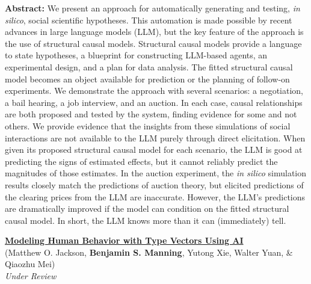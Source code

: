 \documentclass[margin,line,pifont,palatino,courier, 9pt]{res}
\begin{document}
\begin{resume}
\begin{singlespace}
\footnotesize
\textbf{Abstract:}
We present an approach for automatically generating and testing, \emph{in silico}, social scientific hypotheses.
This automation is made possible by recent advances in large language models (LLM), but the key feature of the approach is the use of structural causal models. 
Structural causal models provide a language to state hypotheses, a blueprint for constructing LLM-based agents, an experimental design, and a plan for data analysis.
The fitted structural causal model becomes an object available for prediction or the planning of follow-on experiments.
We demonstrate the approach with several scenarios: a negotiation, a bail hearing, a job interview, and an auction.
In each case, causal relationships are both proposed and tested by the system, finding evidence for some and not others.
We provide evidence that the insights from these simulations of social interactions are not available to the LLM purely through direct elicitation.
When given its proposed structural causal model for each scenario, the LLM is good at predicting the signs of estimated effects, but it cannot reliably predict the magnitudes of those estimates.
In the auction experiment, the \emph{in silico} simulation results closely match the predictions of auction theory, but elicited predictions of the clearing prices from the LLM are inaccurate.
However, the LLM's predictions are dramatically improved if the model can condition on the fitted structural causal model.
In short, the LLM knows more than it can (immediately) tell. 
\end{singlespace}


\href{https://arxiv.org/abs/2608.18265}{\bf Modeling Human Behavior with Type Vectors Using AI}\\
(Matthew O. Jackson\footnotemark[\value{footnote}], \textbf{Benjamin S. Manning}\footnotemark[\value{footnote}], Yutong Xie\footnotemark[\value{footnote}], Walter Yuan, \& Qiaozhu Mei)\\
\textit{Under Review}


\end{resume}
\end{document}
